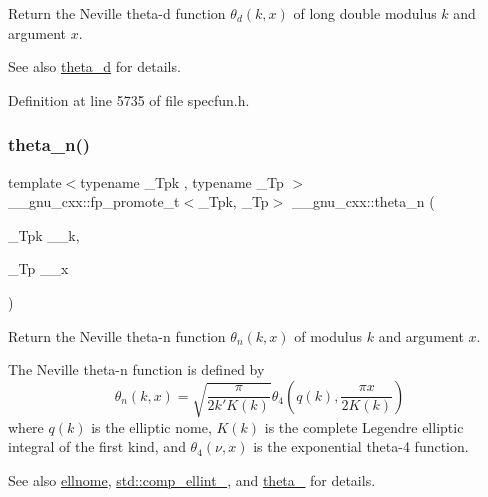Return the Neville theta-\/d function $ \theta_d(k,x) $ of {\ttfamily long double} modulus $ k $ and argument $ x $.

\begin{DoxySeeAlso}{See also}
\hyperlink{group__gnu__math__spec__func_ga258edb995137d9e6344b3cd750266d74}{theta\+\_\+d} for details. 
\end{DoxySeeAlso}


Definition at line 5735 of file specfun.\+h.

\mbox{\label{group__gnu__math__spec__func_ga202778bd650e04e9f3729bfca35c32e2}} 
\subsubsection{\texorpdfstring{theta\+\_\+n()}{theta\_n()}}
{\footnotesize\ttfamily template$<$typename \+\_\+\+Tpk , typename \+\_\+\+Tp $>$ \\
\+\_\+\+\_\+gnu\+\_\+cxx\+::fp\+\_\+promote\+\_\+t$<$\+\_\+\+Tpk, \+\_\+\+Tp$>$ \+\_\+\+\_\+gnu\+\_\+cxx\+::theta\+\_\+n (\begin{DoxyParamCaption}\item[{\+\_\+\+Tpk}]{\+\_\+\+\_\+k,  }\item[{\+\_\+\+Tp}]{\+\_\+\+\_\+x }\end{DoxyParamCaption})\hspace{0.3cm}{\ttfamily [inline]}}

Return the Neville theta-\/n function $ \theta_n(k,x) $ of modulus $ k $ and argument $ x $.

The Neville theta-\/n function is defined by \[ \theta_n(k,x) = \sqrt{\frac{\pi}{2k'K(k)}} \theta_4\left(q(k),\frac{\pi x}{2K(k)}\right) \] where $ q(k) $ is the elliptic nome, $ K(k) $ is the complete Legendre elliptic integral of the first kind, and $ \theta_4(\nu,x) $ is the exponential theta-\/4 function. \begin{DoxySeeAlso}{See also}
\hyperlink{group__gnu__math__spec__func_ga7bfb34f8b5c0ed7c72040f9cb7034bba}{ellnome}, \hyperlink{group__tr29124__math__spec__func_gad559217fb01e7a8b7a6e23eeedda64be}{std\+::comp\+\_\+ellint\+\_}, and \hyperlink{group__gnu__math__spec__func_ga8a6f8b69272a9f205a13e1745832ada3}{theta\+\_} for details.
\end{DoxySeeAlso}

